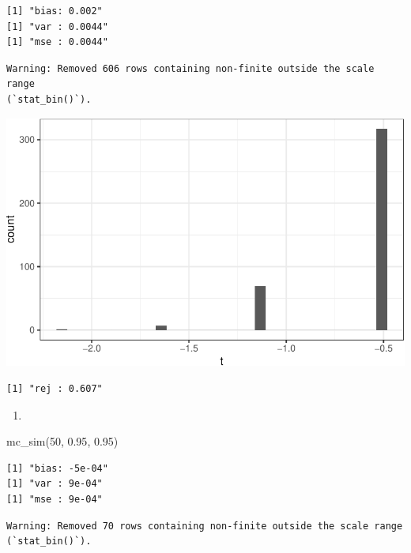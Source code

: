 \documentclass[
  letterpaper,
  DIV=11,
  numbers=noendperiod]{scrreprt}
\newenvironment{Shaded}{\begin{snugshade}}{\end{snugshade}}
\newcommand{\DecValTok}[1]{\textcolor[rgb]{0.68,0.00,0.00}{#1}}
\newcommand{\FloatTok}[1]{\textcolor[rgb]{0.68,0.00,0.00}{#1}}
\newcommand{\FunctionTok}[1]{\textcolor[rgb]{0.28,0.35,0.67}{#1}}
\newcommand{\NormalTok}[1]{\textcolor[rgb]{0.00,0.23,0.31}{#1}}
\providecommand{\tightlist}{%
  \setlength{\itemsep}{0pt}\setlength{\parskip}{0pt}}\usepackage{longtable,booktabs,array}
\begin{document}
\begin{verbatim}
[1] "bias: 0.002"
[1] "var : 0.0044"
[1] "mse : 0.0044"
\end{verbatim}

\begin{verbatim}
Warning: Removed 606 rows containing non-finite outside the scale range
(`stat_bin()`).
\end{verbatim}

\includegraphics{07-inference_files/figure-pdf/unnamed-chunk-15-1.pdf}

\begin{verbatim}
[1] "rej : 0.607"
\end{verbatim}

\begin{enumerate}
\def\labelenumi{\arabic{enumi}.}
\setcounter{enumi}{8}
\tightlist
\item
\end{enumerate}

\begin{Shaded}
\begin{Highlighting}[]
\FunctionTok{mc\_sim}\NormalTok{(}\DecValTok{50}\NormalTok{, }\FloatTok{0.95}\NormalTok{, }\FloatTok{0.95}\NormalTok{)}
\end{Highlighting}
\end{Shaded}

\begin{verbatim}
[1] "bias: -5e-04"
[1] "var : 9e-04"
[1] "mse : 9e-04"
\end{verbatim}

\begin{verbatim}
Warning: Removed 70 rows containing non-finite outside the scale range
(`stat_bin()`).
\end{verbatim}
\end{document}
